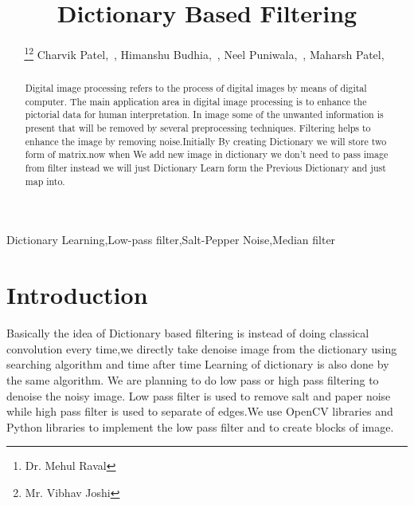 \documentclass[journal]{IEEEtran}
\begin{document}
	\title{Dictionary Based Filtering}
	
	\author{\thanks{Dr. Mehul Raval}\thanks{Mr. Vibhav Joshi} Charvik Patel,~,
		Himanshu Budhia,~,
		Neel Puniwala,~, 
		Maharsh Patel,~}
	
	
	
	
	\maketitle
	
	
	\begin{abstract}
		Digital image processing refers to the process of digital
		images by means of digital computer. The main application
		area in digital image processing is to enhance the pictorial
		data for human interpretation. In image some of
		the unwanted information is present that will be removed by
		several preprocessing techniques. Filtering helps to enhance
		the image by removing noise.Initially By creating Dictionary we will store two form of matrix.now when We add new image in dictionary we don't need to pass image from filter instead we will just Dictionary Learn form the Previous Dictionary and just map into.
		
	\end{abstract}
	\begin{IEEEkeywords}
		Dictionary Learning,Low-pass filter,Salt-Pepper Noise,Median filter
	\end{IEEEkeywords}
	
	
	\IEEEpeerreviewmaketitle
	
	
	
	\section{\textbf{Introduction}}
	Basically the idea of Dictionary based filtering is instead of doing classical convolution every time,we directly take de\textendash noise image from the dictionary using searching algorithm and time after time Learning of dictionary is also done by the same algorithm. We are planning to do low pass or high pass filtering to de\textendash noise the noisy image. Low pass filter is used to remove salt and paper noise while high pass filter is used to separate of edges.We use OpenCV libraries and Python libraries to implement the low pass filter and to create blocks of image.
	
\end{document}

